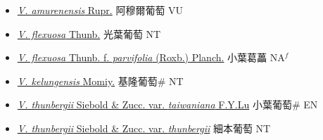 \begin{itemize}
  \begin{itemize}
        \item[] \href{http://www.theplantlist.org/tpl1.1/search?q=Vitis+amurenensis}{\textit{V. amurenensis} Rupr.}   阿穆爾葡萄 VU
        \item[] \href{http://www.theplantlist.org/tpl1.1/search?q=Vitis+flexuosa}{\textit{V. flexuosa} Thunb.}   光葉葡萄 NT
        \item[] \href{http://www.theplantlist.org/tpl1.1/search?q=Vitis+flexuosa+ f. +parvifolia}{\textit{V. flexuosa} Thunb.  f.  \textit{parvifolia} (Roxb.) Planch.}   小葉葛藟 NA$^f$
        \item[] \href{http://www.theplantlist.org/tpl1.1/search?q=Vitis+kelungensis}{\textit{V. kelungensis} Momiy.}   基隆葡萄\# NT
        \item[] \href{http://www.theplantlist.org/tpl1.1/search?q=Vitis+thunbergii+var.+taiwaniana}{\textit{V. thunbergii} Siebold \& Zucc. var. \textit{taiwaniana} F.Y.Lu}   小葉葡萄\# EN
        \item[] \href{http://www.theplantlist.org/tpl1.1/search?q=Vitis+thunbergii+var.+thunbergii}{\textit{V. thunbergii} Siebold \& Zucc. var. \textit{thunbergii}}   細本葡萄 NT
  \end{itemize}
  \end{itemize}
